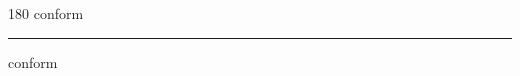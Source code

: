 
\begin{frame}
\begin{center}
\begin{turn}{180}
{\fontsize{2.5cm}{1em}\selectfont conform}
\end{turn}
\vspace{1em}\par  
\hrule
\vspace{1em}\par  
{\fontsize{2.5cm}{1em}\selectfont conform}
\end{center}
\end{frame}
